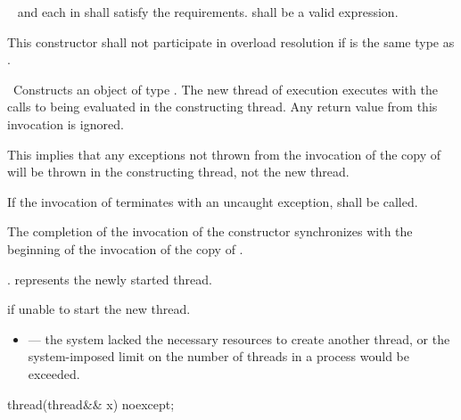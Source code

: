 \begin{itemdescr}
\pnum
\requires\  and each  in  shall satisfy the
 requirements.
 shall be
a va\-lid expression.

\pnum
\remarks
This constructor shall not participate in overload resolution if 
is the same type as .

\pnum
\effects\ Constructs an object of type . The new thread of execution executes
 with the calls to
 being evaluated in the constructing thread. Any return value from this invocation
is ignored. \begin{note} This implies that any exceptions not thrown from the invocation of the copy
of  will be thrown in the constructing thread, not the new thread. \end{note} If the
invocation of
termi\-nates with an uncaught exception,  shall be called.


\pnum\sync The completion of the invocation of the constructor
synchronizes with the beginning of the invocation of the copy of .

\pnum\postconditions {}.  represents the newly started thread.

\pnum\throws {} if unable to start the new thread.

\pnum\errors
\begin{itemize}
\item {} --- the system lacked the necessary
resources to create another thread, or the system-imposed limit on the number of
threads in a process would be exceeded.
\end{itemize}
\end{itemdescr}

%
\begin{itemdecl}
thread(thread&& x) noexcept;
\end{itemdecl}

